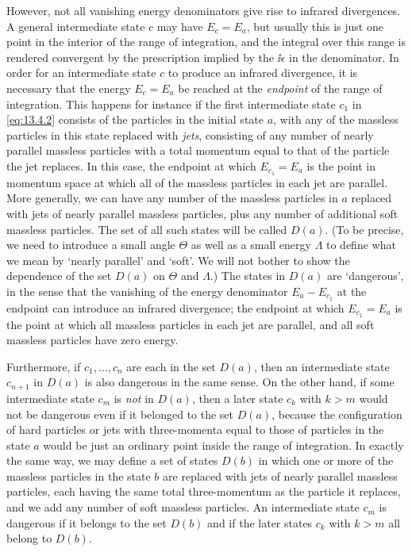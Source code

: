 However, not all vanishing energy denominators give rise to infrared
divergences. A general intermediate state $c$ may have $E_c=E_a$, but usually
this is just one point in the interior of the range of integration, and the
integral over this range is rendered convergent by the prescription implied by
the $\ii\epsilon$ in the denominator. In order for an intermediate state $c$ to
produce an infrared divergence, it is necessary that the energy $E_c=E_a$ be
reached at the \emph{endpoint} of the range of integration. This happens for
instance if the first intermediate state $c_1$ in \eqref{eq:13.4.2}
consists of the particles in the initial state $a$, with any of the massless
particles in this state replaced with \emph{jets}, consisting of any number of
nearly parallel massless particles with a total momentum equal to that of the
particle the jet replaces. In this case, the endpoint at which $E_{c_1}=E_a$
is the point in momentum space at which all of the massless particles in each
jet are parallel. More generally, we can have any number of the massless
particles in $a$ replaced with jets of nearly parallel massless particles,
plus any number of additional soft massless particles. The set of all such
states will be called $D(a)$. (To be precise, we need to introduce a small
angle $\Theta$ as well as a small energy $\Lambda$ to define what we mean by
`nearly parallel' and `soft'. We will not bother to show the dependence of the
set $D(a)$ on $\Theta$ and $\Lambda$.) The states in $D(a)$ are `dangerous', in
the sense that the vanishing of the energy denominator $E_a-E_{c_1}$ at the
endpoint can introduce an infrared divergence; the endpoint at which
$E_{c_1}=E_a$ is the point at which all massless particles in each jet are
parallel, and all soft massless particles have zero energy.

Furthermore, if $c_1,\ldots,c_n$ are each in the set $D(a)$, then an
intermediate state $c_{n+1}$ in $D(a)$ is also dangerous in the same sense. On
the other hand, if some intermediate state $c_m$ is \emph{not} in $D(a)$, then
a later state $c_k$ with $k>m$ would not be dangerous even if it belonged to
the set $D(a)$, because the configuration of hard particles or jets with
three-momenta equal to those of particles in the state $a$ would be just an
ordinary point inside the range of integration. In exactly the same way, we
may define a set of states $D(b)$ in which one or more of the massless
particles in the state $b$ are replaced with jets of nearly parallel massless
particles, each having the same total three-momentum as the particle it
replaces, and we add any number of soft massless particles. An intermediate
state $c_m$ is dangerous if it belongs to the set $D(b)$ and if the later
states $c_k$ with $k>m$ all belong to $D(b)$.

